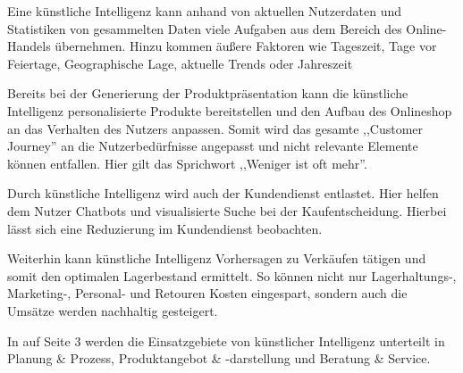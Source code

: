 Eine künstliche Intelligenz kann anhand von aktuellen Nutzerdaten und Statistiken von gesammelten Daten viele Aufgaben aus dem Bereich des Online-Handels übernehmen. Hinzu kommen äußere Faktoren wie Tageszeit, Tage vor Feiertage, Geographische Lage, aktuelle Trends oder Jahreszeit\vspace{0.2cm}

Bereits bei der Generierung der Produktpräsentation kann die künstliche Intelligenz personalisierte Produkte  bereitstellen und den Aufbau des Onlineshop an das Verhalten des Nutzers anpassen. Somit wird das gesamte ,,Customer Journey'' an die Nutzerbedürfnisse angepasst und nicht relevante Elemente können entfallen. Hier gilt das Sprichwort ,,Weniger ist oft mehr''.\vspace{0.2cm}

Durch künstliche Intelligenz wird auch der Kundendienst entlastet. Hier helfen dem Nutzer Chatbots und visualisierte Suche bei der Kaufentscheidung. Hierbei lässt sich eine Reduzierung im Kundendienst beobachten.\vspace{0.2cm}

Weiterhin kann künstliche Intelligenz Vorhersagen zu Verkäufen tätigen und somit den optimalen Lagerbestand ermittelt. So können nicht nur Lagerhaltungs-, Marketing-, Personal- und Retouren Kosten eingespart, sondern auch die Umsätze werden nachhaltig gesteigert.\vspace{0.2cm}

In \cite{glaess2018kuenstliche} auf Seite 3 werden die Einsatzgebiete von künstlicher Intelligenz unterteilt in Planung \& Prozess, Produktangebot \& -darstellung und Beratung \& Service.
